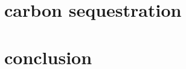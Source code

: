 \documentclass[a4paper,11pt]{article}
\begin{document}
    \section{carbon sequestration}
    
    \section{conclusion}

    \nocite{*}\printbibliography
\end{document}
